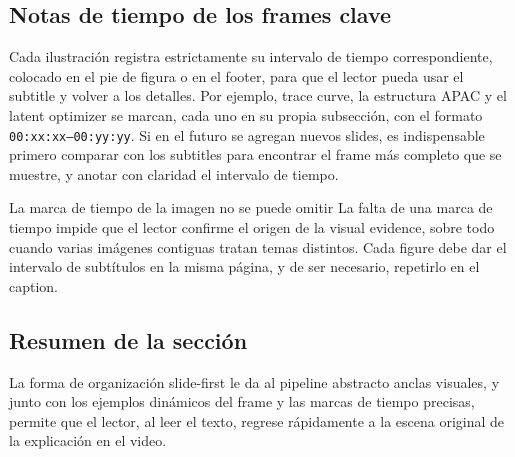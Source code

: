 \subsection{Notas de tiempo de los frames clave}
Cada ilustración registra estrictamente su intervalo de tiempo correspondiente, colocado en el pie de figura o en el footer, para que el lector pueda usar el subtitle y volver a los detalles. Por ejemplo, trace curve, la estructura APAC y el latent optimizer se marcan, cada uno en su propia subsección, con el formato \texttt{00:xx:xx--00:yy:yy}. Si en el futuro se agregan nuevos slides, es indispensable primero comparar con los subtitles para encontrar el frame más completo que se muestre, y anotar con claridad el intervalo de tiempo.
\begin{warningbox}{La marca de tiempo de la imagen no se puede omitir}
La falta de una marca de tiempo impide que el lector confirme el origen de la visual evidence, sobre todo cuando varias imágenes contiguas tratan temas distintos. Cada figure debe dar el intervalo de subtítulos en la misma página, y de ser necesario, repetirlo en el caption.
\end{warningbox}

\subsection{Resumen de la sección}
La forma de organización slide-first le da al pipeline abstracto anclas visuales, y junto con los ejemplos dinámicos del frame y las marcas de tiempo precisas, permite que el lector, al leer el texto, regrese rápidamente a la escena original de la explicación en el video.

